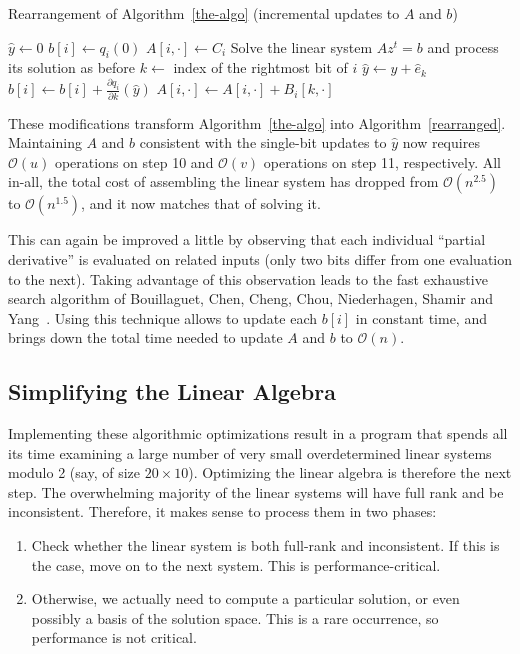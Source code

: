 \documentclass[a4paper,UKenglish,cleveref, autoref]{lipics-v2019}
\newcommand{\bigO}[1]{\ensuremath{\mathcal{O}\left( #1 \right)} }
\begin{document}
\begin{algorithm}
  \caption{\label{rearranged} Rearrangement of Algorithm~\ref{the-algo} (incremental updates to $A$ and $b$)}
\begin{algorithmic}[1]
  \State $\hat y \gets 0$ 
  \State $b[i] \gets  q_i(0)$
  \State $A[i, \cdot] \gets C_i$
  \EndFor
   
  \State Solve the linear system $Az^t = b$ and process its solution as before
  \State $k \gets $ index of the rightmost bit of $i$ 
  \State $\hat y \gets \hat y + \hat e_k$
   
  \State $b[i] \gets b[i] + \frac{\partial q_i}{\partial k}(\hat y)$
  \State $A[i, \cdot] \gets A[i, \cdot] + B_i[k, \cdot]$
  \EndFor
  \EndFor
\end{algorithmic}
\end{algorithm}

These modifications transform Algorithm~\ref{the-algo} into
Algorithm~\ref{rearranged}.  Maintaining $A$ and $b$ consistent with the
single-bit updates to $\hat y$ now requires $\bigO{u}$ operations on step 10 and
$\bigO{v}$ operations on step 11, respectively. All in-all, the total cost of
assembling the linear system has dropped from $\bigO{n^{2.5}}$ to
$\bigO{n^{1.5}}$, and it now matches that of solving it.

This can again be improved a little by observing that each individual ``partial
derivative'' is evaluated on related inputs (only two bits differ from one
evaluation to the next). Taking advantage of this observation leads to the fast
exhaustive search algorithm of Bouillaguet, Chen, Cheng, Chou, Niederhagen,
Shamir and Yang~\cite{BouillaguetCCCNSY10}. Using this technique allows to
update each $b[i]$ in constant time, and brings down the total time needed to
update $A$ and $b$ to $\bigO{n}$.

\subsection{Simplifying the Linear Algebra}

Implementing these algorithmic optimizations result in a program that spends all
its time examining a large number of very small overdetermined linear systems
modulo 2 (say, of size $20 \times 10$). Optimizing the linear algebra is
therefore the next step. The overwhelming majority of the linear systems will
have full rank and be inconsistent. Therefore, it makes sense to process them in
two phases:
\begin{enumerate}
  \item Check whether the linear system is both full-rank and inconsistent. If
  this is the case, move on to the next system. This is performance-critical.
  \item Otherwise, we actually need to compute a particular solution, or even
  possibly a basis of the solution space. This is a rare occurrence, so
  performance is not critical.
\end{enumerate}
\end{document}
